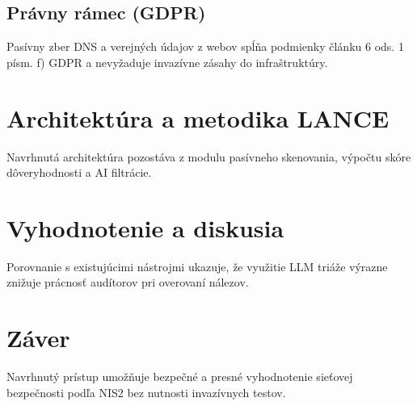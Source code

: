 \documentclass[11pt,a4paper,twocolumn]{article}
\begin{document}
\subsection{Právny rámec (GDPR)}
Pasívny zber DNS a verejných údajov z webov spĺňa podmienky článku 6 ods. 1 písm. f) GDPR \cite{gdpr2016} a nevyžaduje invazívne zásahy do infraštruktúry.

\section{Architektúra a metodika LANCE}
Navrhnutá architektúra pozostáva z modulu pasívneho skenovania, výpočtu skóre dôveryhodnosti a AI filtrácie.

\section{Vyhodnotenie a diskusia}
Porovnanie s existujúcimi nástrojmi ukazuje, že využitie LLM triáže výrazne znižuje prácnosť audítorov pri overovaní nálezov.

\section{Záver}
Navrhnutý prístup umožňuje bezpečné a presné vyhodnotenie sieťovej bezpečnosti podľa NIS2 bez nutnosti invazívnych testov.



\end{document}

